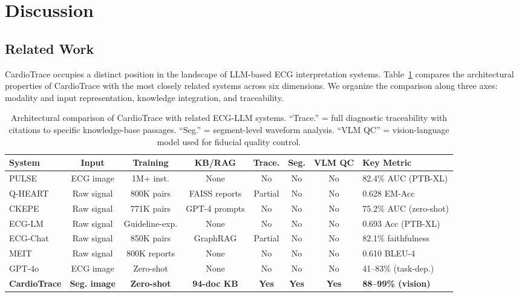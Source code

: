 \documentclass[journal,compsoc]{IEEEtran}
\newcommand{\system}{CardioTrace}
\begin{document}
\section{Discussion}
\label{sec:discussion}

\subsection{Related Work}

\system{} occupies a distinct position in the landscape of LLM-based ECG interpretation systems. Table~\ref{tab:comparison} compares the architectural properties of \system{} with the most closely related systems across six dimensions. We organize the comparison along three axes: modality and input representation, knowledge integration, and traceability.

\begin{table}[t]
\centering
\caption{Architectural comparison of \system{} with related ECG-LLM systems. ``Trace.'' = full diagnostic traceability with citations to specific knowledge-base passages. ``Seg.'' = segment-level waveform analysis. ``VLM QC'' = vision-language model used for fiducial quality control.}
\label{tab:comparison}
\begin{tabular}{lccccccl}
\toprule
System & Input & Training & KB/RAG & Trace. & Seg. & VLM QC & Key Metric \\
\midrule
PULSE~\cite{li2026pulse} & ECG image & 1M+ inst. & None & No & No & No & 82.4\% AUC (PTB-XL) \\
Q-HEART~\cite{qheart2025} & Raw signal & 800K pairs & FAISS reports & Partial & No & No & 0.628 EM-Acc \\
CKEPE~\cite{ckepe2024} & Raw signal & 771K pairs & GPT-4 prompts & No & No & No & 75.2\% AUC (zero-shot) \\
ECG-LM~\cite{ecg_lm_2025} & Raw signal & Guideline-exp. & None & No & No & No & 0.693 Acc (PTB-XL) \\
ECG-Chat~\cite{ecg_chat2024} & Raw signal & 850K pairs & GraphRAG & Partial & No & No & 82.1\% faithfulness \\
MEIT~\cite{meit2024} & Raw signal & 800K reports & None & No & No & No & 0.610 BLEU-4 \\
GPT-4o~\cite{engelstein2025gpt4o_ecg} & ECG image & Zero-shot & None & No & No & No & 41--83\% (task-dep.) \\
\midrule
\textbf{\system{}} & \textbf{Seg. image} & \textbf{Zero-shot} & \textbf{94-doc KB} & \textbf{Yes} & \textbf{Yes} & \textbf{Yes} & \textbf{88--99\% (vision)} \\
\bottomrule
\end{tabular}
\end{table}
\end{document}
